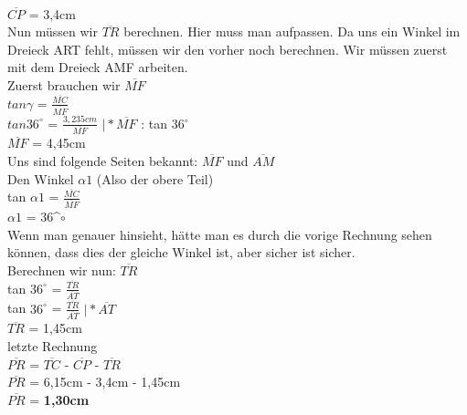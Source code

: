 \documentclass[12pt, a4paper]{article}
\begin{document}
\begin{flushleft}
\begin{flushleft}
			\\\(\overline{CP}\) = 3,4cm
			\\ Nun müssen wir \(\overline{TR}\) berechnen. Hier muss man aufpassen.
				Da uns ein Winkel im Dreieck ART fehlt, müssen wir den vorher noch berechnen.
				Wir müssen zuerst mit dem Dreieck AMF arbeiten.
			\\ Zuerst brauchen wir \(\overline{MF}\)
			\\ \(tan \gamma\) = \(\frac{\overline{MC}}{\overline{MF}}\)
			\\ \(tan 36^\circ\) = \(\frac{3,235cm}{\overline{MF}}\)
			\(\vert * \overline{MF}\) : tan 36\(^\circ \)
			\\ \(\overline{MF}\) = 4,45cm
			\\ Uns sind folgende Seiten bekannt: \(\overline{MF}\) und \(\overline{AM}\)		
			\\ Den Winkel \(\alpha 1 \) (Also der obere Teil)
			\\ tan \(\alpha 1\) = \(\frac{\overline{MC}}{\overline{MF}}\)
			\\ \(\alpha 1\) = 36^\(\circ\)
			\\ Wenn man genauer hinsieht, hätte man es durch die vorige Rechnung sehen können, 					dass dies der gleiche Winkel ist, aber sicher ist sicher.
			\\ Berechnen wir nun: \(\overline{TR}\)
			\\ tan \(36^\circ\) = \(\frac{\overline{TR}}{\overline{AT}}\)
			\\ tan \(36^\circ\) = \(\frac{\overline{TR}}{\overline{AT}}\)
				\(\vert * \overline{AT}\)
			\\ \(\overline{TR}\) = 1,45cm
			\\ letzte Rechnung 
			\\ \(\overline{PR}\) = \(\overline{TC}\) - \(\overline{CP}\) - \(\overline{TR}\)
			\\ \(\overline{PR}\) = 6,15cm - 3,4cm - 1,45cm
			\\ \(\overline{PR}\) = \textbf{1,30cm}
		\end{flushleft}
		
	\end{flushleft}	
\end{document}

